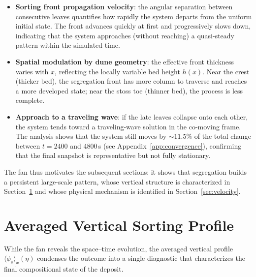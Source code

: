 \documentclass[12pt, a4paper]{article}
\begin{document}
\begin{itemize}
    \item \textbf{Sorting front propagation velocity}: the angular separation
          between consecutive leaves quantifies how rapidly the system departs
          from the uniform initial state. The front advances quickly at first and
          progressively slows down, indicating that the system approaches
          (without reaching) a quasi-steady pattern within the simulated time.
    \item \textbf{Spatial modulation by dune geometry}: the effective front
          thickness varies with $x$, reflecting the locally variable bed height
          $h(x)$. Near the crest (thicker bed), the segregation front has more
          column to traverse and reaches a more developed state; near the
          stoss toe (thinner bed), the process is less complete.
    \item \textbf{Approach to a traveling wave}: if the late leaves collapse
          onto each other, the system tends toward a traveling-wave solution
          in the co-moving frame. The analysis shows that the system still moves
          by $\sim 11.5\%$ of the total change between $t = 2400$ and $4800$\,s
          (see Appendix~\ref{app:convergence}), confirming that the final
          snapshot is representative but not fully stationary.
\end{itemize}

The fan thus motivates the subsequent sections: it shows that segregation
builds a persistent large-scale pattern, whose vertical structure is
characterized in Section~\ref{sec:sorting} and whose physical mechanism is
identified in Section~\ref{sec:velocity}.

\newpage
\section{Averaged Vertical Sorting Profile}
\label{sec:sorting}

While the fan reveals the space--time evolution, the averaged vertical
profile $\langle\phi_s\rangle_x(\eta)$ condenses the outcome into a single
diagnostic that characterizes the final compositional state of the deposit.
\end{document}
